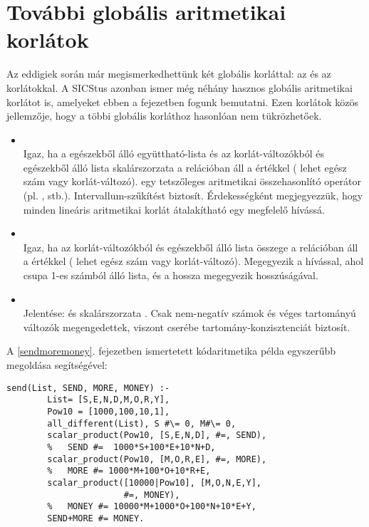 \section{További globális aritmetikai korlátok}

Az eddigiek során már megismerkedhettünk két globális korláttal: az 
és az  korlátokkal. A SICStus azonban ismer még néhány hasznos
globális aritmetikai korlátot is, amelyeket ebben a fejezetben fogunk bemutatni. Ezen
korlátok közös jellemzője, hogy a többi globális korláthoz hasonlóan nem tükrözhetőek.

\begin{itemize}
\item {} \\
Igaz, ha a  egészekből álló együttható-lista és az  korlát-változókból
és egészekből álló lista skalárszorzata a  relációban áll a 
értékkel ( lehet egész szám vagy korlát-változó).  egy tetszőleges
aritmetikai összehasonlító operátor (pl. \cd{\#=}, \cd{\#<} stb.). Intervallum-szűkítést
biztosít. Érdekességként megjegyezzük, hogy minden lineáris aritmetikai korlát
átalakítható egy megfelelő  hívássá.

\item {} \\
Igaz, ha az  korlát-változókból és egészekből álló lista összege a 
relációban áll a  értékkel ( lehet egész szám vagy korlát-változó).
Megegyezik a  hívással, ahol 
csupa 1-es számból álló lista, és a hossza megegyezik  hosszúságával.

\item {} \\
Jelentése:  és  skalárszorzata . Csak nem-negatív
számok és véges tartományú változók megengedettek, viszont cserébe tartomány-konzisztenciát
biztosít.
\end{itemize}

A \ref{sendmoremoney}. fejezetben ismertetett kódaritmetika példa egyszerűbb megoldása
 segítségével:

\begin{verbatim}
send(List, SEND, MORE, MONEY) :-
        List= [S,E,N,D,M,O,R,Y], 
        Pow10 = [1000,100,10,1],
        all_different(List), S #\= 0, M#\= 0,
        scalar_product(Pow10, [S,E,N,D], #=, SEND),
        %   SEND #=  1000*S+100*E+10*N+D,
        scalar_product(Pow10, [M,O,R,E], #=, MORE),
        %   MORE #= 1000*M+100*O+10*R+E,
        scalar_product([10000|Pow10], [M,O,N,E,Y], 
                       #=, MONEY),
        %   MONEY #= 10000*M+1000*O+100*N+10*E+Y,
        SEND+MORE #= MONEY.
\end{verbatim}

